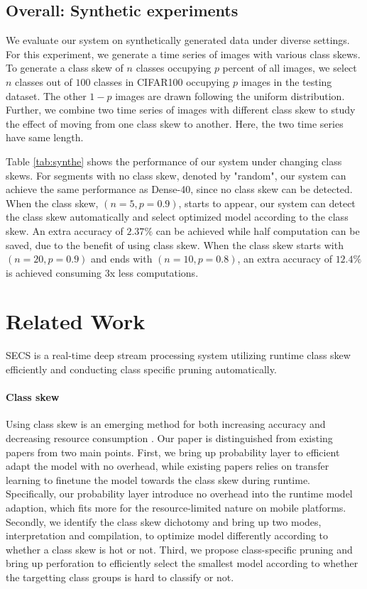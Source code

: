 \documentclass[pageno]{jpaper}
\begin{document}
\subsection{Overall: Synthetic experiments}
We evaluate our system on synthetically generated data under diverse settings. For this experiment, we generate a time series of images with various class skews. To generate a class skew of $n$ classes occupying $p$ percent of all images, we select $n$ classes out of $100$ classes in CIFAR100 occupying $p$ images in the testing dataset. The other $1-p$ images are drawn following the uniform distribution. Further, we combine two time series of images with different class skew to study the effect of moving from one class skew to another. Here, the two time series have same length.

Table \ref{tab:synthe} shows the performance of our system under changing class skews. For segments with no class skew, denoted by "random", our system can achieve the same performance as Dense-40, since no class skew can be detected. When the class skew, $(n=5,p=0.9)$, starts to appear, our system can detect the class skew automatically and select optimized model according to the class skew. An extra accuracy of $2.37\%$ can be achieved while half computation can be saved, due to the benefit of using class skew. When the class skew starts with $(n=20,p=0.9)$ and ends with $(n=10,p=0.8)$, an extra accuracy of $12.4\%$ is achieved consuming $3$x less computations.  


\section{Related Work} \label{relatedWork}
SECS is a real-time deep stream processing system utilizing runtime class skew efficiently and conducting class specific pruning automatically.



\paragraph{Class skew}
Using class skew is an emerging method for both increasing accuracy and decreasing resource consumption \cite{han2016mcdnn, kang2017noscope, shen2016fast}. Our paper is distinguished from existing papers from two main points. First, we bring up probability layer to efficient adapt the model with no overhead, while existing papers relies on transfer learning to finetune the model towards the class skew during runtime. Specifically, our probability layer introduce no overhead into the runtime model adaption, which fits more for the resource-limited nature on mobile platforms. Secondly, we identify the class skew dichotomy and bring up two modes, interpretation and compilation, to optimize model differently according to whether a class skew is hot or not. Third, we propose class-specific pruning and bring up perforation to efficiently select the smallest model according to whether the targetting class groups is hard to classify or not.
\end{document}
